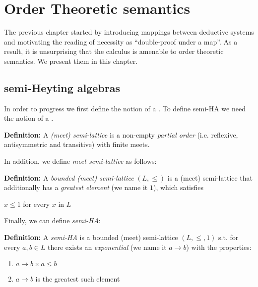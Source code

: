 \chapter{Order Theoretic semantics}
\label{jcalcsem}
The previous chapter started by introducing 
mappings between deductive systems and 
motivating the reading of necessity as ``double-proof under a map''.
As a result, it is unsurprising that the calculus is amenable to order theoretic semantics.
We present them in this chapter.

\section{semi-Heyting algebras}
In order to progress we first define the notion of a 
. 
To define semi-HA we need the notion of a .
  

\begin{mdframed}
\textbf{Definition:}
A \textit{(meet) semi-lattice} is a non-empty \emph{partial order} (i.e. reflexive, antisymmetric and transitive) 
with finite meets.
\end{mdframed}
In addition, we define \emph{meet semi-lattice} as follows: 
\begin{mdframed}
\textbf{Definition:}
A \textit{bounded (meet) semi-lattice} $(L,\le)$ is a (meet) 
semi-lattice that additionally has 
a \emph{greatest element} (we name it $1$), which satisfies

$x \le 1$ for every $x$ in $L$
\end{mdframed}
Finally, we can define \emph{semi-HA}:

\begin{mdframed}
\textbf{Definition:}
A \textit{semi-HA} is a bounded (meet) semi-lattice $(L,\le, 1)$ 
s.t. for every $a,b\in L$ there exists an \textit{exponential} 
(we name it $a\rightarrow b$) 
with the properties: 
\begin{enumerate}
\item $a\rightarrow b\times a\le b $
\item $a\rightarrow b$ is the greatest such element
\end{enumerate}
\end{mdframed}

